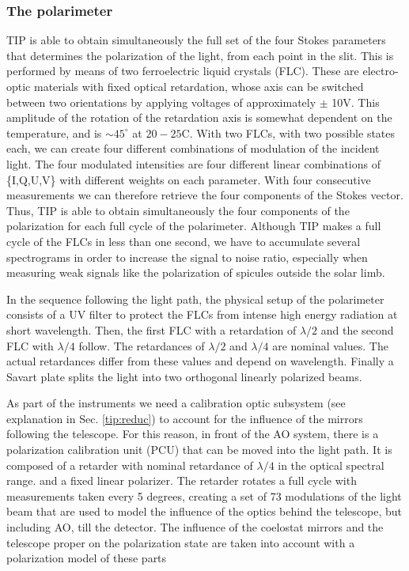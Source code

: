 \subsubsection*{The polarimeter\label{polarimeter}}
TIP is able to obtain simultaneously the full set of the four Stokes parameters that determines the polarization of the light, from each point in the slit. This is performed by means of two ferroelectric liquid crystals (FLC). These are electro-optic materials with fixed optical retardation, whose axis can be switched between two orientations by applying voltages of approximately $\pm$ 10V. This amplitude of the rotation of the retardation axis is somewhat dependent on the temperature, and is $\sim 45^{\circ}$ at $20-25$C. With two FLCs, with two possible states each, we can create four different combinations of modulation of the incident light. The four modulated intensities are four different linear combinations of \{I,Q,U,V\} with different weights on each parameter. With four consecutive measurements we can therefore retrieve the four components of the Stokes vector. Thus, TIP is able to obtain simultaneously the four components of the polarization for each full cycle of the polarimeter. Although TIP makes a full cycle of the FLCs in less than one second, we have to accumulate several spectrograms in order to increase the signal to noise ratio, especially when measuring weak signals like the polarization of spicules outside the solar limb.

In the sequence following the light path, the physical setup of the polarimeter consists of a UV filter to protect the FLCs from intense high energy radiation at short wavelength. Then, the first FLC with a retardation of $\lambda/2$ and the second FLC with $\lambda/4$ follow. The retardances of $\lambda/2$ and $\lambda/4$ are nominal values. The actual retardances differ from these values and depend on wavelength. Finally a Savart plate splits the light into two orthogonal linearly polarized beams.

As part of the instruments we need a calibration optic subsystem (see explanation in Sec.  \ref{tip:reduc}) to account for the influence of the mirrors following the telescope. For this reason, in front of the AO system, there is a polarization calibration unit (PCU) that can be moved into the light path. It is composed of a retarder with nominal retardance of $\lambda/4$ in the optical spectral range. and a fixed linear polarizer. The retarder rotates a full cycle with measurements taken every 5 degrees, creating a set of 73 modulations of the light beam that are used to model the influence of the optics behind the telescope, but including AO, till the detector. The influence of the coelostat mirrors and the telescope proper on the polarization state are taken into account with a polarization model of these parts \cite{2005A&A...443.1047B}


